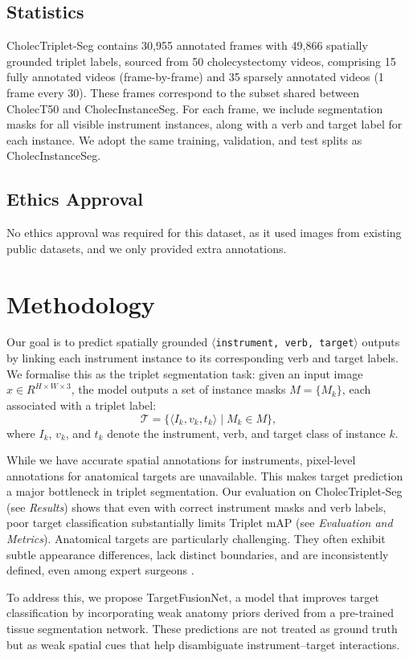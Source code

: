 \documentclass[pdflatex,sn-mathphys-num]{sn-jnl}%
\newcommand{\ivttriplet}{\texttt{$\langle$instrument, verb, target$\rangle$}\xspace}
\newcommand{\anatprior}{weak anatomy\xspace}
\newcommand{\mAP}{\textrm{mAP}}
\theoremstyle{thmstyleone}%
\theoremstyle{thmstyletwo}%
\theoremstyle{thmstylethree}%
\begin{document}
\subsection{Statistics}  
CholecTriplet-Seg contains 30,955 annotated frames with 49,866 spatially grounded triplet labels, sourced from 50 cholecystectomy videos, comprising 15 fully annotated videos (frame-by-frame) and 35 sparsely annotated videos (1 frame every 30). These frames correspond to the subset shared between CholecT50 and CholecInstanceSeg. For each frame, we include segmentation masks for all visible instrument instances, along with a verb and target label for each instance. We adopt the same training, validation, and test splits as CholecInstanceSeg.



\subsection{Ethics Approval}
No ethics approval was required for this dataset, as it used images from existing public datasets, and we only provided extra annotations. 

\section{Methodology}
Our goal is to predict spatially grounded \ivttriplet outputs by linking each instrument instance to its corresponding verb and target labels. We formalise this as the triplet segmentation task: given an input image $x \in R^{H \times W \times 3}$, the model outputs a set of instance masks $M = \{ M_k \}$, each associated with a triplet label:
\[
    \mathcal{T} = \{ \langle I_k, v_k, t_k \rangle \mid M_k \in M \},
\]
where $I_k$, $v_k$, and $t_k$ denote the instrument, verb, and target class of instance $k$.

While we have accurate spatial annotations for instruments, pixel-level annotations for anatomical targets are unavailable. This makes target prediction a major bottleneck in triplet segmentation. Our evaluation on CholecTriplet-Seg (see \emph{Results}) shows that even with correct instrument masks and verb labels, poor target classification substantially limits Triplet $\mAP$ (see \emph{Evaluation and Metrics}). Anatomical targets are particularly challenging.
They often exhibit subtle appearance differences, lack distinct boundaries, and are inconsistently defined, even among expert surgeons \cite{owen2022automated}.

To address this, we propose TargetFusionNet, a model that improves target classification by incorporating \anatprior priors derived from a pre-trained tissue segmentation network. These predictions are not treated as ground truth but as weak spatial cues that help disambiguate instrument–target interactions.
\end{document}
